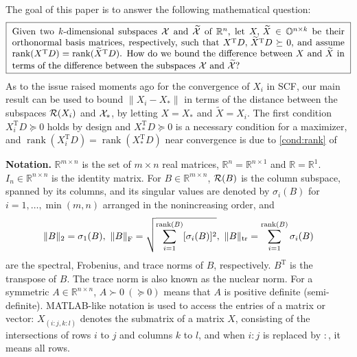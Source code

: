 \documentclass[11pt]{article}
\def\bbO{\mathbb{O}}
\def\bbR{\mathbb{R}}
\def\one{\pmb{1}}
\def\cR{{\cal R}}
\def\cX{{\cal X}}
\DeclareMathOperator{\eig}{eig}
\DeclareMathOperator{\rank}{rank}
\DeclareMathOperator{\tr}{tr}
\DeclareMathOperator{\F}{F}
\DeclareMathOperator{\T}{T}
\def\wtd{\widetilde}
\theoremstyle{definition}
\numberwithin{equation}{section}
\numberwithin{figure}{section}
\numberwithin{table}{section}
\begin{document}
The goal of this paper is to answer the following mathematical question:
\begin{equation}\label{eq:TheQuestion}
\framebox{
\parbox{12.7cm}{Given two $k$-dimensional subspaces $\cX$ and $\wtd\cX$ of $\bbR^n$,
let $X,\,\wtd X\in\bbO^{n\times k}$ be their orthonormal basis matrices, respectively,
such that $X^{\T}D,\,\wtd X^{\T}D\succeq 0$, and assume $\rank(X^{\T}D)=\rank(\wtd X^{\T}D)$.
How do we bound the difference between $X$ and $\wtd X$ in terms of
the difference between the subspaces $\cX$ and $\wtd\cX$?}
}
\end{equation}
As to the issue raised moments ago for the convergence of $X_i$ in SCF, our main result can be
used to
bound $\|X_i-X_*\|$ in terms of the distance between the subspaces $\cR(X_i)$ and
$\cX_*$, by letting $X=X_*$ and $\wtd X=X_i$. The first condition $X_i^{\T}D\succeq 0$ holds by design and
$X_*^{\T}D\succeq 0$ is a necessary condition for a maximizer, and
$\rank(X_i^{\T}D)=\rank(X_*^{\T}D)$ near convergence is due to \eqref{cond:rank} of
\cite[Lemma 5.1]{luli:2022}


{\bf Notation.}
$\bbR^{m\times n}$ is the set of $m\times n$ real matrices, $\bbR^n=\bbR^{n\times 1}$ and $\bbR=\bbR^1$. $I_n\in\bbR^{n\times n}$ is
the identity matrix.
For $B\in\bbR^{m\times n}$,
$\cR(B)$ is the column subspace, spanned by its columns, and its singular values are denoted by
$\sigma_i(B)$ for $i=1,\ldots,\min(m,n)$ arranged in the nonincreasing order,
and
$$
\|B\|_2=\sigma_1(B),\,\,
\|B\|_{\F}=\sqrt{\sum_{i=1}^{{\rm rank}(B)}[\sigma_i(B)]^2},\,\,
\|B\|_{\tr}=\sum_{i=1}^{{\rm rank}(B)}\sigma_i(B)
$$
are the spectral, Frobenius, and trace norms of $B$, respectively.
$B^{\T}$ is the transpose of $B$. The trace norm is also known as the nuclear norm.
For a symmetric $A\in\bbR^{n\times n}$,
$A\succ 0 ~(\succeq 0)$ means that $A$ is positive definite (semi-definite).
MATLAB-like notation is used to access the entries of a matrix or vector:
$X_{(i:j,k:l)}$ denotes the submatrix of a matrix $X$, consisting of the intersections of
rows $i$ to $j$ and columns $k$ to $l$, and when $i : j$ is replaced by $:$, it means all rows.
\end{document}
